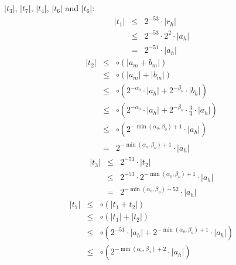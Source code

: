 \documentclass[a4paper,10pt,twoside]{article}
\newenvironment{proof}[1][Proof]{\begin{trivlist}
\item[\hskip \labelsep {\bfseries #1}]}{\end{trivlist}}
\newcommand{\hi}{\ensuremath{\mathit{h}}}
\newcommand{\mi}{\ensuremath{\mathit{m}}}
\begin{document}
\begin{proof}
$\left \vert t_3 \right \vert$, $\left \vert t_7 \right \vert$, $\left \vert
  t_4 \right \vert$, $\left \vert t_6 \right \vert$ and $\left \vert t_6 \right \vert$:
\begin{eqnarray*}
\left \vert t_1 \right \vert & \leq & 2^{-53} \cdot \left \vert r_\hi \right \vert \\
& \leq & 2^{-53} \cdot 2^2 \cdot \left \vert a_\hi \right \vert \\
& = & 2^{-51} \cdot \left \vert a_\hi \right \vert 
\end{eqnarray*}
\begin{eqnarray*}
\left \vert t_2 \right \vert & \leq & \circ \left( \left \vert a_\mi + b_\mi \right \vert \right)  \\
& \leq & \circ \left( \left \vert a_\mi \right \vert + \left \vert b_\mi \right \vert \right) \\
& \leq & \circ \left( 2^{-\alpha_o} \cdot \left \vert a_\hi \right \vert + 2^{-\beta_o} \cdot \left \vert b_\hi \right \vert \right) \\
& \leq & \circ \left( 2^{-\alpha_o} \cdot \left \vert a_\hi \right \vert + 2^{-\beta_o} \cdot \frac{3}{4} \cdot \left \vert a_\hi \right \vert \right) \\
& \leq & \circ \left( 2^{-\min\left(\alpha_o,\beta_o\right) + 1} \cdot \left \vert a_\hi \right \vert \right) \\
& = & 2^{-\min\left(\alpha_o,\beta_o\right) + 1} \cdot \left \vert a_\hi \right \vert 
\end{eqnarray*}
\begin{eqnarray*}
\left \vert t_3 \right \vert & \leq & 2^{-53} \cdot \left \vert t_2 \right \vert \\
& \leq & 2^{-53} \cdot 2^{-\min\left(\alpha_o,\beta_o\right) + 1} \cdot \left \vert a_\hi \right \vert \\
& = & 2^{-\min\left(\alpha_o,\beta_o\right)-52} \cdot \left \vert a_\hi \right \vert 
\end{eqnarray*}
\begin{eqnarray*}
\left \vert t_7 \right \vert & \leq & \circ \left( \left \vert t_1 + t_2 \right \vert \right) \\
& \leq & \circ \left( \left \vert t_1 \right \vert + \left \vert t_2 \right \vert \right) \\
& \leq & \circ \left( 2^{-51} \cdot \left \vert a_\hi \right \vert + 2^{-\min\left(\alpha_o,\beta_o\right) + 1} 
\cdot \left \vert a_\hi \right \vert \right) \\
& \leq & \circ \left( 2^{-\min\left(\alpha_o,\beta_o\right) + 2} \cdot \left \vert a_\hi \right \vert \right) \\

\end{eqnarray*}
\end{proof}
\end{document}
